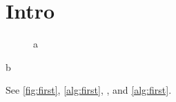 \documentclass{wrapper}
\begin{document}
\wrapperclass\articleclass\layoutmode\hypermode
\section{Intro}
\begin{figure}\label{fig:first}a\end{figure}
\begin{algorithm}\label{alg:first}b\end{algorithm}
See \autoref{fig:first}, \cref{alg:first}, , and \vref{alg:first}.
\end{document}

